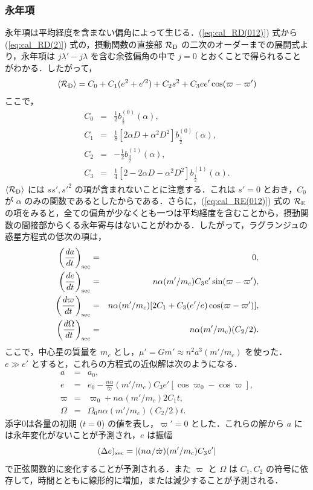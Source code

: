 \documentclass[11pt,a4paper,oneside,onecolumn]{jreport}
\begin{document}
\subsubsection{永年項}
永年項は平均経度を含まない偏角によって生じる．(\ref{eq:cal_RD(012)}) 式から (\ref{eq:cal_RD(2)}) 式の，摂動関数の直接部 ${\cal R}_{\rm D}$ の二次のオーダーまでの展開式より，永年項は $j \lambda' - j \lambda$ を含む余弦偏角の中で $j = 0$ とおくことで得られることがわかる．したがって，
\begin{equation}
\langle {\cal R}_{\rm D} \rangle = C_0 + C_1 (e^2 + e'^2) + C_2 s^2 + C_3 e e' \cos (\varpi - \varpi')
\end{equation}
ここで，
\begin{eqnarray}
C_0 & = & \frac{1}{2} b_{\frac{1}{2}}^{(0)} (\alpha), \\
C_1 & = & \frac{1}{8} [ 2 \alpha D + \alpha^2 D^2 ] b_{\frac{1}{2}}^{(0)} (\alpha), \\
C_2 & = & - \frac{1}{2} b_{\frac{3}{2}}^{(1)} (\alpha), \\
C_3 & = & \frac{1}{4} [ 2 - 2 \alpha D - \alpha^2 D^2 ] b_{\frac{1}{2}}^{(1)} (\alpha).
\end{eqnarray}
$\langle {\cal R}_{\rm D} \rangle$ には $s s', s'^2$ の項が含まれないことに注意する．これは $s' = 0$ とおき，$C_0$ が $\alpha$ のみの関数であるとしたからである．さらに，(\ref{eq:cal_RE(012)}) 式の ${\cal R}_{\rm E}$ の項をみると，全ての偏角が少なくとも一つは平均経度を含むことから，摂動関数の間接部からくる永年寄与はないことがわかる．したがって，ラグランジュの惑星方程式の低次の項は，
\begin{eqnarray}
\left( \frac{d a}{d t} \right)_{\rm sec} & = & 0, \\
\left( \frac{d e}{d t} \right)_{\rm sec} & = & n \alpha (m' / m_c) C_3 e' \sin (\varpi - \varpi'), \\
\left( \frac{d \varpi}{d t} \right)_{\rm sec} & = & n \alpha (m' / m_c) [2 C_1 + C_3 (e' / e) \cos (\varpi - \varpi') ], \\
\left( \frac{d \Omega}{d t} \right)_{\rm sec} & = & n \alpha (m' / m_c) (C_2 / 2).
\end{eqnarray}
ここで，中心星の質量を $m_c$ とし，$\mu' = G m' \approx n^2 a^3 (m' / m_c)$ を使った．$e \gg e'$ とすると，これらの方程式の近似解は次のようになる．
\begin{eqnarray}
a & = & a_0, \\
e & = & e_0 - \frac{n \alpha}{\dot{\varpi}} (m' / m_c) C_3 e' [\cos \varpi_0 - \cos \varpi], \\
\varpi & = & \varpi_0 + n \alpha (m' / m_c) 2 C_1 t, \\
\Omega & = & \Omega_0 n \alpha (m' / m_c) (C_2 / 2) t.
\end{eqnarray}
添字0は各量の初期 ($t = 0$) の値を表し，$\varpi' = 0$ とした．これらの解から $a$ には永年変化がないことが予測され，$e$ は振幅
\begin{equation}
(\Delta e)_{\rm sec} = | (n \alpha /\dot{\varpi}) (m' / m_c) C_3 e' |
\end{equation}
で正弦関数的に変化することが予測される．また $\varpi$ と $\Omega$ は $C_1, C_2$ の符号に依存して，時間とともに線形的に増加，または減少することが予測される．
\end{document}
